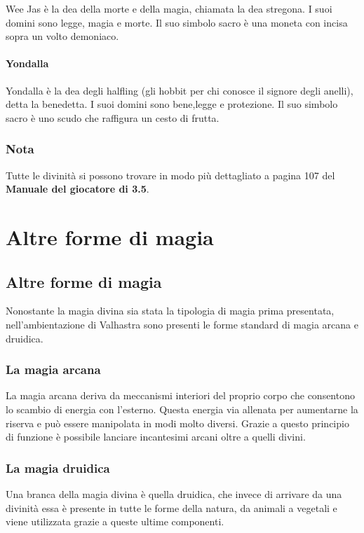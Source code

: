 \documentclass[a4paper,12pt]{book}
\begin{document}
Wee Jas è la dea della morte e della magia, chiamata la dea stregona.
I suoi domini sono legge, magia e morte.
Il suo simbolo sacro è una moneta con incisa sopra un volto demoniaco.

\subsubsection{Yondalla}

Yondalla è la dea degli halfling (gli hobbit per chi conosce il signore degli anelli), detta la benedetta.
I suoi domini sono bene,legge e protezione.
Il suo simbolo sacro è uno scudo che raffigura un cesto di frutta.

\subsection{Nota}

Tutte le divinità si possono trovare in modo più dettagliato a pagina 107 del \textbf{Manuale del giocatore di 3.5}.

\saltariga
\chapter{Altre forme di magia}
\section{Altre forme di magia}

Nonostante la magia divina sia stata la tipologia di magia prima presentata, nell'ambientazione di Valhastra sono presenti le forme standard di magia arcana e druidica.

\subsection{La magia arcana}

La magia arcana deriva da meccanismi interiori del proprio corpo che consentono lo scambio di energia con l'esterno. Questa energia via allenata per aumentarne la riserva  e può essere manipolata in modi molto diversi.
Grazie a questo principio di funzione è possibile lanciare incantesimi arcani oltre a quelli divini.

\subsection{La magia druidica}

Una branca della magia divina è quella druidica, che invece di arrivare da una divinità essa è presente in tutte le forme della natura, da animali a vegetali e viene utilizzata grazie a queste ultime componenti.
\end{document}
